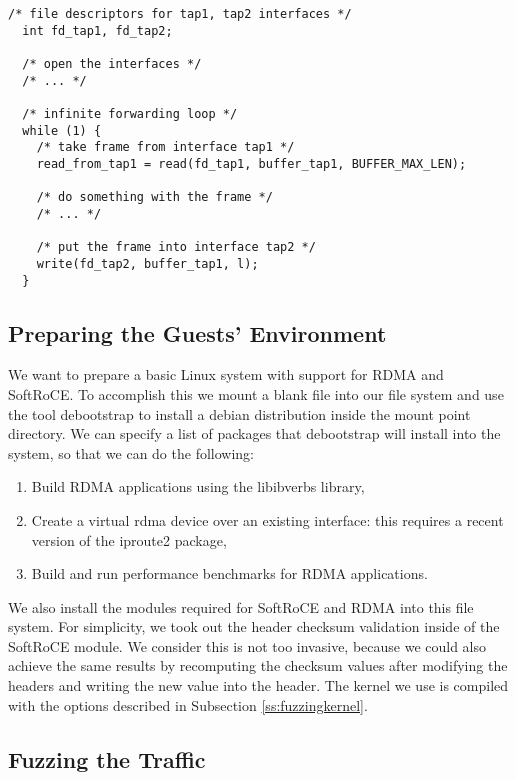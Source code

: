 \begin{lstlisting}[caption={Forwarding traffic in the proxy fuzzer process}, label={lst:fwdtraffic},  style=CStyle, float, floatplacement=H]
  /* file descriptors for tap1, tap2 interfaces */
  int fd_tap1, fd_tap2;

  /* open the interfaces */
  /* ... */

  /* infinite forwarding loop */
  while (1) {
    /* take frame from interface tap1 */
    read_from_tap1 = read(fd_tap1, buffer_tap1, BUFFER_MAX_LEN);

    /* do something with the frame */
    /* ... */

    /* put the frame into interface tap2 */
    write(fd_tap2, buffer_tap1, l);
  }
\end{lstlisting}

\subsection{Preparing the Guests' Environment}

We want to prepare a basic Linux system with support for RDMA and SoftRoCE.
To accomplish this we mount a blank file into our file system and use the tool
debootstrap to install a debian distribution inside the mount point directory.
We can specify a list of packages that debootstrap will install into the system,
so that we can do the following:

\begin{enumerate}
  \item Build RDMA applications using the libibverbs library,
  \item Create a virtual rdma device over an existing interface: this requires a recent version of the iproute2 package,
  \item Build and run performance benchmarks for RDMA applications.
\end{enumerate}

We also install the modules required for SoftRoCE and RDMA into this file system.
For simplicity, we took out the header checksum validation inside of the SoftRoCE module. We consider
this is not too invasive, because we could also achieve the same results by recomputing the checksum values after modifying
the headers and writing the new value into the header.
The kernel we use is compiled with the options described in Subsection \ref{ss:fuzzingkernel}.

\subsection{Fuzzing the Traffic}

